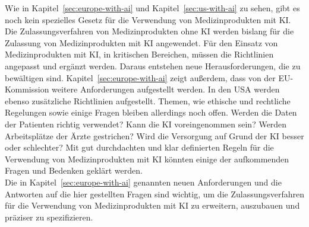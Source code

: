 Wie in Kapitel~\ref{sec:europe-with-ai} und Kapitel~\ref{sec:us-with-ai} zu sehen,
gibt es noch kein spezielles Gesetz für die Verwendung von Medizinprodukten mit KI.
Die Zulassungsverfahren von Medizinprodukten ohne KI werden bislang für die Zulassung von Medizinprodukten mit KI angewendet.
Für den Einsatz von Medizinprodukten mit KI, in kritischen Bereichen, müssen die Richtlinien angepasst und ergänzt werden.
Daraus entstehen neue Herausforderungen, die zu bewältigen sind.
Kapitel~\ref{sec:europe-with-ai} zeigt außerdem, dass von der EU-Kommission weitere Anforderungen aufgestellt werden.
In den USA werden ebenso zusätzliche Richtlinien aufgestellt.
Themen, wie ethische und rechtliche Regelungen sowie einige Fragen bleiben allerdings noch offen.
Werden die Daten der Patienten richtig verwendet? Kann die KI voreingenommen sein?
Werden Arbeitsplätze der Ärzte gestrichen? 
Wird die Versorgung auf Grund der KI besser oder schlechter? 
Mit gut durchdachten und klar definierten Regeln für die Verwendung von Medizinprodukten mit KI könnten einige
der aufkommenden Fragen und Bedenken geklärt werden.\\
Die in Kapitel~\ref{sec:europe-with-ai} genannten neuen Anforderungen und die Antworten auf die hier gestellten Fragen sind wichtig, 
um die Zulassungsverfahren für die Verwendung von Medizinprodukten mit KI zu erweitern,
auszubauen und präziser zu spezifizieren.